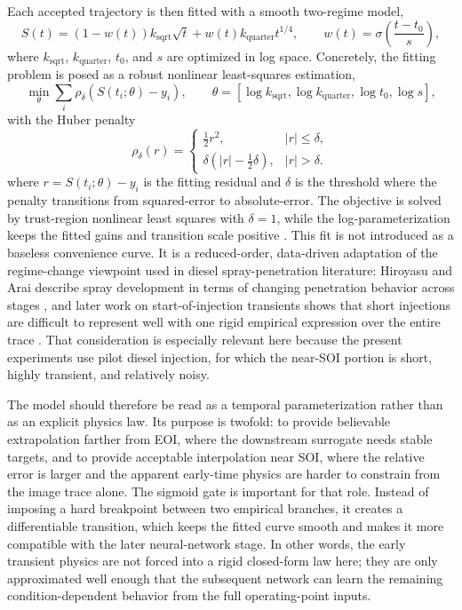 \documentclass[english, 12pt, a4paper, elec, utf8, a-2b, online]{aaltothesis}
\begin{document}
Each accepted trajectory is then fitted with a smooth two-regime model,
\[
S(t)=\left(1-w(t)\right)k_{\mathrm{sqrt}}\sqrt{t}
+w(t)k_{\mathrm{quarter}}t^{1/4},
\qquad
w(t)=\sigma\!\left(\frac{t-t_0}{s}\right),
\]
where \(k_{\mathrm{sqrt}}\), \(k_{\mathrm{quarter}}\), \(t_0\), and \(s\) are optimized in log space. Concretely, the fitting problem is posed as a robust nonlinear least-squares estimation,
\[
\min_{\theta}
\sum_i \rho_\delta\!\left(S(t_i;\theta)-y_i\right),
\qquad
\theta=
\left[\log k_{\mathrm{sqrt}},\log k_{\mathrm{quarter}},\log t_0,\log s\right],
\]
with the Huber penalty
\[
\rho_\delta(r)=
\begin{cases}
\tfrac{1}{2}r^2, & |r|\le \delta,\\
\delta\left(|r|-\tfrac{1}{2}\delta\right), & |r|>\delta.
\end{cases}
\]
where \(r = S(t_i;\theta)-y_i\) is the fitting residual and \(\delta\) is the threshold where the penalty transitions from squared-error to absolute-error. The objective is solved by trust-region nonlinear least squares with \(\delta=1\), while the log-parameterization keeps the fitted gains and transition scale positive \cite{Huber1964,NocedalWright2006}. This fit is not introduced as a baseless convenience curve. It is a reduced-order, data-driven adaptation of the regime-change viewpoint used in diesel spray-penetration literature: Hiroyasu and Arai describe spray development in terms of changing penetration behavior across stages \cite{HiroyasuArai1990}, and later work on start-of-injection transients shows that short injections are difficult to represent well with one rigid empirical expression over the entire trace \cite{ZhouLiYi2021}. That consideration is especially relevant here because the present experiments use pilot diesel injection, for which the near-SOI portion is short, highly transient, and relatively noisy.

The model should therefore be read as a temporal parameterization rather than as an explicit physics law. Its purpose is twofold: to provide believable extrapolation farther from EOI, where the downstream surrogate needs stable targets, and to provide acceptable interpolation near SOI, where the relative error is larger and the apparent early-time physics are harder to constrain from the image trace alone. The sigmoid gate is important for that role. Instead of imposing a hard breakpoint between two empirical branches, it creates a differentiable transition, which keeps the fitted curve smooth and makes it more compatible with the later neural-network stage. In other words, the early transient physics are not forced into a rigid closed-form law here; they are only approximated well enough that the subsequent network can learn the remaining condition-dependent behavior from the full operating-point inputs.
\end{document}
